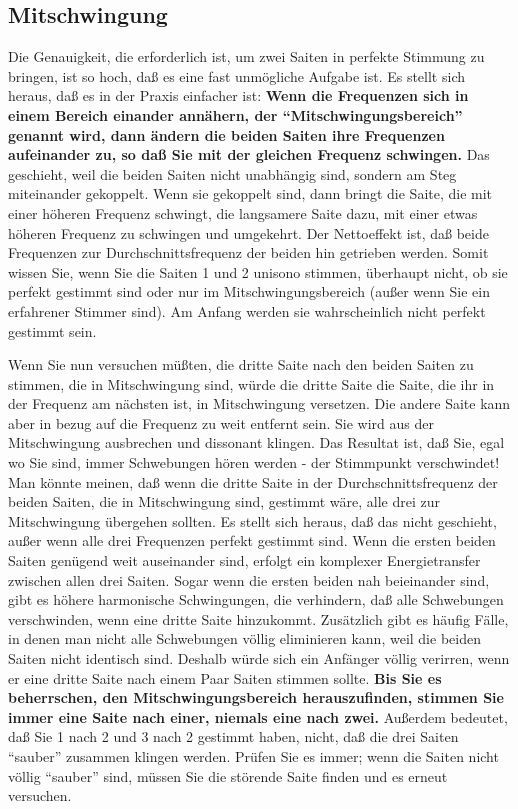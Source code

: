 
\hypertarget{c2_5e}{}
\subsection{Mitschwingung}\hypertarget{c2_5_mits}{} 

Die Genauigkeit, die erforderlich ist, um zwei Saiten in perfekte Stimmung zu bringen, ist so hoch, daß es eine fast unmögliche Aufgabe ist.
Es stellt sich heraus, daß es in der Praxis einfacher ist: \textbf{Wenn die Frequenzen sich in einem Bereich einander annähern, der \enquote{Mitschwingungsbereich} genannt wird, dann ändern die beiden Saiten ihre Frequenzen aufeinander zu, so daß Sie mit der gleichen Frequenz schwingen.}
Das geschieht, weil die beiden Saiten nicht unabhängig sind, sondern am Steg miteinander gekoppelt.
Wenn sie gekoppelt sind, dann bringt die Saite, die mit einer höheren Frequenz schwingt, die langsamere Saite dazu, mit einer etwas höheren Frequenz zu schwingen und umgekehrt.
Der Nettoeffekt ist, daß beide Frequenzen zur Durchschnittsfrequenz der beiden hin getrieben werden.
Somit wissen Sie, wenn Sie die Saiten 1 und 2 unisono stimmen, überhaupt nicht, ob sie perfekt gestimmt sind oder nur im Mitschwingungsbereich (außer wenn Sie ein erfahrener Stimmer sind).
Am Anfang werden sie wahrscheinlich nicht perfekt gestimmt sein.

Wenn Sie nun versuchen müßten, die dritte Saite nach den beiden Saiten zu stimmen, die in Mitschwingung sind, würde die dritte Saite die Saite, die ihr in der Frequenz am nächsten ist, in Mitschwingung versetzen.
Die andere Saite kann aber in bezug auf die Frequenz zu weit entfernt sein.
Sie wird aus der Mitschwingung ausbrechen und dissonant klingen.
Das Resultat ist, daß Sie, egal wo Sie sind, immer Schwebungen hören werden - der Stimmpunkt verschwindet!
Man könnte meinen, daß wenn die dritte Saite in der Durchschnittsfrequenz der beiden Saiten, die in Mitschwingung sind, gestimmt wäre, alle drei zur Mitschwingung übergehen sollten.
Es stellt sich heraus, daß das nicht geschieht, außer wenn alle drei Frequenzen perfekt gestimmt sind.
Wenn die ersten beiden Saiten genügend weit auseinander sind, erfolgt ein komplexer Energietransfer zwischen allen drei Saiten.
Sogar wenn die ersten beiden nah beieinander sind, gibt es höhere harmonische Schwingungen, die verhindern, daß alle Schwebungen verschwinden, wenn eine dritte Saite hinzukommt.
Zusätzlich gibt es häufig Fälle, in denen man nicht alle Schwebungen völlig eliminieren kann, weil die beiden Saiten nicht identisch sind.
Deshalb würde sich ein Anfänger völlig verirren, wenn er eine dritte Saite nach einem Paar Saiten stimmen sollte.
\textbf{Bis Sie es beherrschen, den Mitschwingungsbereich herauszufinden, stimmen Sie immer eine Saite nach einer, niemals eine nach zwei.}
Außerdem bedeutet, daß Sie 1 nach 2 und 3 nach 2 gestimmt haben, nicht, daß die drei Saiten \enquote{sauber} zusammen klingen werden.
Prüfen Sie es immer; wenn die Saiten nicht völlig \enquote{sauber} sind, müssen Sie die störende Saite finden und es erneut versuchen.

